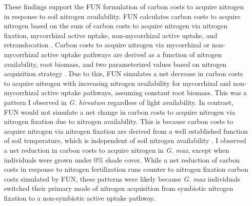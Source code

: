 These findings support the FUN formulation of carbon costs to acquire nitrogen in response to soil nitrogen availability. FUN calculates carbon costs to acquire nitrogen based on the sum of carbon costs to acquire nitrogen via nitrogen fixation, mycorrhizal active uptake, non-mycorrhizal active uptake, and retranslocation . Carbon costs to acquire nitrogen via mycorrhizal or non-mycorrhizal active uptake pathways are derived as a function of nitrogen availability, root biomass, and two parameterized values based on nitrogen acquisition strategy . Due to this, FUN simulates a net decrease in carbon costs to acquire nitrogen with increasing nitrogen availability for mycorrhizal and non-mycorrhizal active uptake pathways, assuming constant root biomass. This was a pattern I observed in \textit{G. hirsutum} regardless of light availability. In contrast, FUN would not simulate a net change in carbon costs to acquire nitrogen via nitrogen fixation due to nitrogen availability. This is because carbon costs to acquire nitrogen via nitrogen fixation are derived from a well established function of soil temperature, which is independent of soil nitrogen availability . I observed a net reduction in carbon costs to acquire nitrogen in \textit{G. max}, except when individuals were grown under 0\% shade cover. While a net reduction of carbon costs in response to nitrogen fertilization runs counter to nitrogen fixation carbon costs simulated by FUN, these patterns were likely because \textit{G. max} individuals switched their primary mode of nitrogen acquisition from symbiotic nitrogen fixation to a non-symbiotic active uptake pathway.

